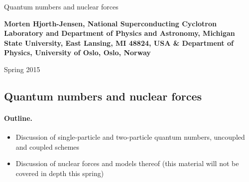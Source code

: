 \documentclass[%
twoside,                 %
final,                   %
10pt]{article}
\begin{document}




\thispagestyle{empty}

\begin{center}
{\LARGE\bf
\begin{spacing}{1.25}
Quantum numbers and nuclear forces
\end{spacing}
}
\end{center}


\begin{center}
{\bf Morten Hjorth-Jensen, National Superconducting Cyclotron Laboratory and Department of Physics and Astronomy, Michigan State University, East Lansing, MI 48824, USA {\&} Department of Physics, University of Oslo, Oslo, Norway${}^{}$} \\ [0mm]
\end{center}

    \begin{center}
\end{center}
    

\begin{center} %
Spring 2015
\end{center}

\vspace{1cm}


\subsection*{Quantum numbers and nuclear forces}

\paragraph{Outline.}
\begin{itemize}
\item Discussion of single-particle and two-particle quantum numbers, uncoupled and coupled schemes

\item Discussion of nuclear forces and models thereof (this material will not be covered in depth this spring)
\end{itemize}
\end{document}
